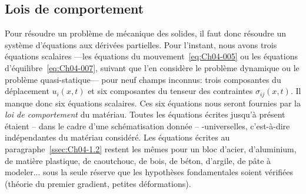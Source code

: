 \subsection{Lois de comportement}  \label{ssec:Ch04-1.3}
Pour résoudre un problème de mécanique des solides, il faut donc résoudre un système d'équations aux dérivées partielles.
Pour l'instant, nous avons trois équations scalaires ---les équations du mouvement~\eqref{eq:Ch04-005} ou les équations d'équilibre~\eqref{eq:Ch04-007}, suivant que l'en considère le problème dynamique ou le problème quasi-statique--- pour neuf champs inconnus: trois composantes du déplacement $u_i(x,t)$ et six composantes du tenseur des contraintes $\sigma_{ij}(x,t)$. Il manque donc six équations scalaires.
Ces six équations nous seront fournies par la \emph{loi de comportement} du matériau.
Toutes les équations écrites jusqu'à présent étaient -- dans le cadre d'une schématisation donnée -- -universelles, c'est-à-dire indépendantes du matériau considéré.
Les équations écrites au paragraphe~\ref{ssec:Ch04-1.2} restent les mêmes pour un bloc d'acier, d'aluminium, de matière plastique, de caoutchouc, de bois, de béton, d'argile, de pâte à modeler... sous la seule réserve que les hypothèses fondamentales soient vérifiées (théorie du premier gradient, petites déformations).

